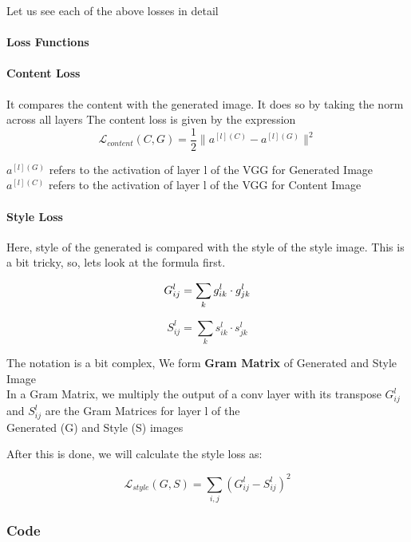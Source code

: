 \documentclass[11pt]{article}
\begin{document}
Let us see each of the above losses in detail

    \hypertarget{loss-functions}{%
\paragraph{Loss Functions}\label{loss-functions}}

    \hypertarget{content-loss}{%
\paragraph{Content Loss}\label{content-loss}}

It compares the content with the generated image. It does so by taking
the norm across all layers The content loss is given by the expression\\
\[
\mathcal{L}_{content} (C,G) = \frac{1}{2} \lVert a^{[l](C)} - a^{[l](G)} \rVert ^{2}
\]

\(a^{[l](G)}\) refers to the activation of layer l of the VGG for
Generated Image\\
\(a^{[l](C)}\) refers to the activation of layer l of the VGG for
Content Image

    \hypertarget{style-loss}{%
\paragraph{Style Loss}\label{style-loss}}
Here, style of the generated is compared with the style of the style
image. This is a bit tricky, so, lets look at the formula first.

\[
 G_{ij}^{l} = \sum_{k} g_{ik}^{l} \cdot  g_{jk}^{l} \\
\]

\[
S_{ij}^{l} = \sum_{k} s_{ik}^{l} \cdot  s_{jk}^{l}
\]


The notation is a bit complex, We form \textbf{Gram Matrix} of Generated
and Style Image\\
In a Gram Matrix, we multiply the output of a conv layer with its
transpose \(G_{ij}^{l}\) and \(S_{ij}^{l}\) are the Gram Matrices for
layer l of the\\
Generated (G) and Style (S) images

After this is done, we will calculate the style loss as:

\[
\mathcal{L}_{style}(G,S) = \sum_{i,j} (G_{ij}^{l} - S_{ij}^{l})^{2}
\]
\pagebreak

    \hypertarget{code}{%
\subsubsection{Code}\label{code}}
\end{document}
